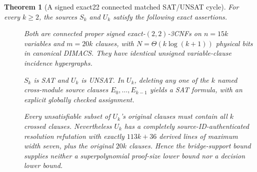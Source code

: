 \documentclass[10pt]{article}
\newtheorem{theorem}{Theorem}
\begin{document}
\begin{theorem}[A signed exact22 connected matched SAT/UNSAT cycle]\label{th:cycle}
For every $k\ge2$, the sources $S_k$ and $U_k$ satisfy the following exact assertions.
\begin{description}
\item[] Both are connected proper signed exact-$(2,2)$-3CNFs on $n=15k$ variables and $m=20k$ clauses, with $N=\Theta(k\log(k+1))$ physical bits in canonical DIMACS. They have identical unsigned variable-clause incidence hypergraphs.
\item[] $S_k$ is SAT and $U_k$ is UNSAT. In $U_k$, \emph{deleting any one} of the $k$ named cross-module source clauses $E_0,\dots,E_{k-1}$ yields a SAT formula, with an explicit globally checked assignment.
\item[] Every unsatisfiable subset of $U_k$'s original clauses must contain \emph{all} $k$ crossed clauses. Nevertheless $U_k$ has a completely source-ID-authenticated resolution refutation with exactly $113k+36$ derived lines of maximum width seven, plus the original $20k$ clauses. Hence the bridge-support bound supplies neither a superpolynomial proof-size lower bound nor a decision lower bound.
\end{description}
\end{theorem}
\end{document}
